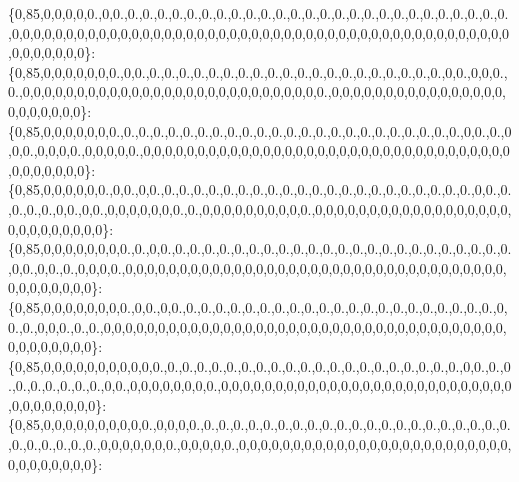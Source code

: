 \{0,85,0,0,0,0,0.,0,0.,0.,0.,0.,0.,0.,0.,0.,0.,0.,0.,0.,0.,0.,0.,0.,0.,0.,0.,0.,0.,0.,0.,0.,0.,0.,0.,0,0,0,0,0,0,0,0,0,0,0,0,0,0,0,0,0,0,0,0,0,0,0,0,0,0,0,0,0,0,0,0,0,0,0,0,0,0,0,0,0,0,0,0,0,0,0,0,0,0,0,0,0\}\+: \{0,85,0,0,0,0,0,0,0.,0,0.,0.,0.,0.,0.,0.,0.,0.,0.,0.,0.,0.,0.,0.,0.,0.,0.,0.,0.,0.,0.,0,0.,0,0,0.,0.,0,0,0,0,0,0,0,0,0,0,0,0,0,0,0,0,0,0,0,0,0,0,0,0,0,0,0,0.,0,0,0,0,0,0,0,0,0,0,0,0,0,0,0,0,0,0,0,0,0,0,0\}\+: \{0,85,0,0,0,0,0,0,0.,0.,0.,0.,0.,0.,0.,0.,0.,0.,0.,0.,0.,0.,0.,0.,0.,0.,0.,0.,0.,0.,0.,0.,0,0.,0.,0,0,0.,0,0,0,0.,0,0,0,0,0.,0,0,0,0,0,0,0,0,0,0,0,0,0,0,0,0,0,0,0,0,0,0,0,0,0,0,0,0,0,0,0,0,0,0,0,0,0,0,0,0,0\}\+: \{0,85,0,0,0,0,0,0.,0,0.,0,0.,0.,0.,0.,0.,0.,0.,0.,0.,0.,0.,0.,0.,0.,0.,0.,0.,0.,0.,0.,0.,0.,0,0.,0.,0.,0.,0.,0,0.,0,0.,0,0,0,0,0,0,0.,0.,0,0,0,0,0,0,0,0,0,0.,0,0,0,0,0,0,0,0,0,0,0,0,0,0,0,0,0,0,0,0,0,0,0,0,0,0,0\}\+: \{0,85,0,0,0,0,0,0,0,0.,0.,0,0.,0.,0.,0.,0.,0.,0.,0.,0.,0.,0.,0.,0.,0.,0.,0.,0.,0.,0.,0.,0.,0.,0.,0.,0,0.,0,0.,0.,0,0,0,0.,0,0,0,0,0,0,0,0,0,0,0,0,0,0,0,0,0,0,0,0,0,0,0,0,0,0,0,0,0,0,0,0,0,0,0,0,0,0,0,0,0,0,0\}\+: \{0,85,0,0,0,0,0,0,0,0.,0,0.,0,0.,0.,0.,0.,0.,0.,0.,0.,0.,0.,0.,0.,0.,0.,0.,0.,0.,0.,0.,0.,0.,0.,0,0.,0.,0,0,0.,0.,0.,0,0,0,0,0,0,0,0,0,0,0,0,0,0,0,0,0,0,0,0,0,0,0,0,0,0,0,0,0,0,0,0,0,0,0,0,0,0,0,0,0,0,0,0,0\}\+: \{0,85,0,0,0,0,0,0,0,0,0,0,0.,0.,0.,0.,0.,0.,0.,0.,0.,0.,0.,0.,0.,0.,0.,0.,0.,0.,0.,0.,0.,0,0.,0.,0.,0.,0.,0.,0.,0.,0.,0,0.,0,0,0,0,0,0,0,0.,0,0,0,0,0,0,0,0,0,0,0,0,0,0,0,0,0,0,0,0,0,0,0,0,0,0,0,0,0,0,0,0,0,0,0\}\+: \{0,85,0,0,0,0,0,0,0,0,0,0.,0,0,0,0.,0.,0.,0.,0.,0.,0.,0.,0.,0.,0.,0.,0.,0.,0.,0.,0.,0.,0.,0.,0.,0.,0.,0.,0.,0.,0.,0.,0,0,0,0,0,0,0.,0,0,0,0,0.,0,0,0,0,0,0,0,0,0,0,0,0,0,0,0,0,0,0,0,0,0,0,0,0,0,0,0,0,0,0,0,0,0\}\+: 